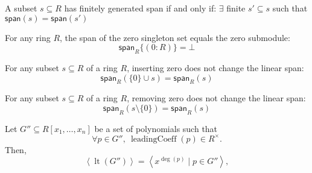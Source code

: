 \begin{lemma}\label{mem_span_iff''}



\end{lemma}

\begin{lemma}\label{fg_span_iff_fg_span_finset_subset}


  A subset $s \subseteq R$ has finitely generated span if and only if:
$\exists$ finite $s' \subseteq s$ such that $\mathsf{span}(s) = \mathsf{span}(s')$

\end{lemma}

\begin{lemma}\label{span_singleton_zero}
  \leanok

  For any ring \( R \), the span of the zero singleton set equals the zero submodule:
\[
\mathsf{span}_R \{(0 : R)\} = \bot
\]

\end{lemma}

\begin{lemma}\label{span_insert_zero}
  \leanok

  For any subset $s \subseteq R$ of a ring $R$, inserting zero does not change the linear span:
\[
\mathsf{span}_R(\{0\} \cup s) = \mathsf{span}_R(s)
\]

\end{lemma}

\begin{lemma}\label{span_sdiff_singleton_zero}
  \leanok
  For any subset $s \subseteq R$ of a ring $R$, removing zero does not change the linear span:
\[
\mathsf{span}_R(s \setminus \{0\}) = \mathsf{span}_R(s)
\]

\end{lemma}

\begin{lemma}\label{leadingTerm_ideal_span_monomial}
  \leanok
  Let \( G'' \subseteq R[x_1, \dots, x_n] \) be a set of polynomials such that
\[
\forall p \in G'',\ \operatorname{leadingCoeff}(p) \in R^\times.
\]
Then,
\[
\left\langle \operatorname{lt}(G'') \right\rangle = \left\langle x^{\deg(p)} \mid p \in G'' \right\rangle,
\]

\end{lemma}

